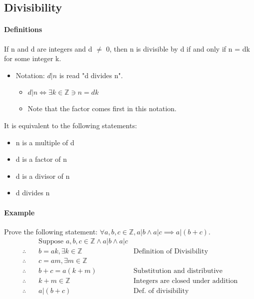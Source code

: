 \subsection{Divisibility}
\hrulefill

\paragraph*{Definitions}
If n and d are integers and d $\neq$ 0, then n is divisible by d if and only if n = dk for some integer k.
\begin{itemize}
    \item Notation: $d|n$ is read "d divides n".
    \begin{itemize}
        \item $d|n \iff \exists k \in \mathbb{Z} \ni n=dk$
        \item Note that the factor comes first in this notation.
    \end{itemize}
\end{itemize}

It is equivalent to the following statements:
\begin{itemize}
    \item n is a multiple of d
    \item d is a factor of n
    \item d is a divisor of n
    \item d divides n
\end{itemize}

\paragraph*{Example}
Prove the following statement: $\forall a,b,c \in \mathbb{Z}, a|b \land a|c \implies a|(b+c)$.
\begin{align*}
    & \text{Suppose } a,b,c \in \mathbb{Z} \land a|b \land a|c\\
    \therefore \quad & b=ak, \exists k \in \mathbb{Z} & \text{Definition of Divisibility}\\
    \therefore \quad & c=am, \exists m \in \mathbb{Z}\\
    \therefore \quad & b+c=a(k+m) & \text{Substitution and distributive}\\
    \therefore \quad & k+m \in \mathbb{Z} & \text{Integers are closed under addition}\\
    \therefore \quad & a|(b+c) & \text{Def. of divisibility}
\end{align*}

